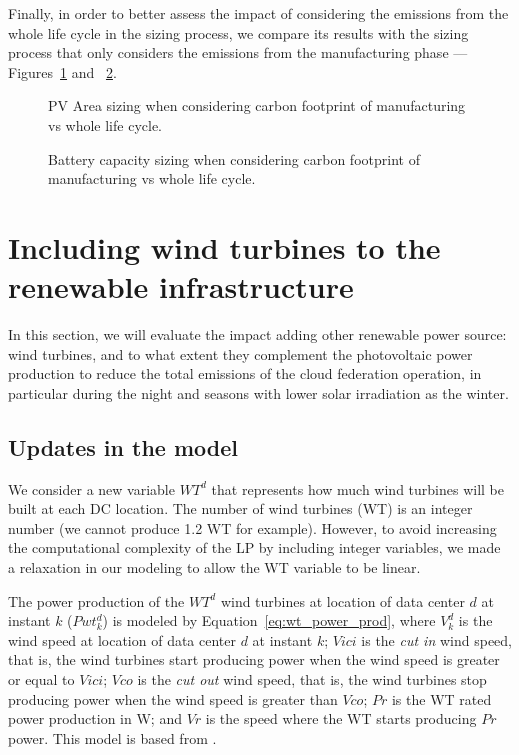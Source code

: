 Finally, in order to better assess the impact of considering the emissions from the whole life cycle in the sizing process, we compare its results with the sizing process that only considers the emissions from the manufacturing phase --- Figures~\ref{fig:pv_lca} and ~\ref{fig:bat_lca}.



\begin{figure}[h]
  \centering
  {}
  \caption{PV Area sizing when considering carbon footprint of manufacturing vs whole life cycle. }
  \label{fig:pv_lca}
\end{figure}


\begin{figure}[h]
  \centering
  {}
  \caption{Battery capacity sizing when considering carbon footprint of manufacturing vs whole life cycle.  }
  \label{fig:bat_lca}
\end{figure}



\section{Including wind turbines to the renewable infrastructure}
\label{sec:add_wt}
In this section, we will evaluate the impact adding other renewable power source: wind turbines, and to what extent they complement the photovoltaic power production to reduce the total emissions of the cloud federation operation, in particular during the night and seasons with lower solar irradiation as the winter.

\subsection{Updates in the model}
\label{sec:ex_model_wt}

We consider a new variable $WT^d$ that represents how much wind turbines will be built at each DC location. The number of wind turbines (WT) is an integer number (we cannot produce 1.2 WT for example). However, to avoid increasing the computational complexity of the LP by including integer variables, we made a relaxation in our modeling to allow the WT variable to be linear. 

The power production of the $WT^d$ wind turbines at location of data center $d$ at instant $k$ ($Pwt^d_{k}$) is modeled by Equation~\ref{eq:wt_power_prod}, where $V^d_k$ is the wind speed at location of data center $d$ at instant $k$; $Vici$ is the \textit{cut in} wind speed, that is, the wind turbines start producing power when the wind speed is greater or equal to $Vici$; $Vco$ is the \textit{cut out} wind speed, that is, the wind turbines stop producing power when the wind speed is greater than $Vco$; $Pr$ is the WT rated power production in W; and $Vr$ is the speed where the WT starts producing $Pr$ power. This model is based from \cite{HADDAD2021100505}.

